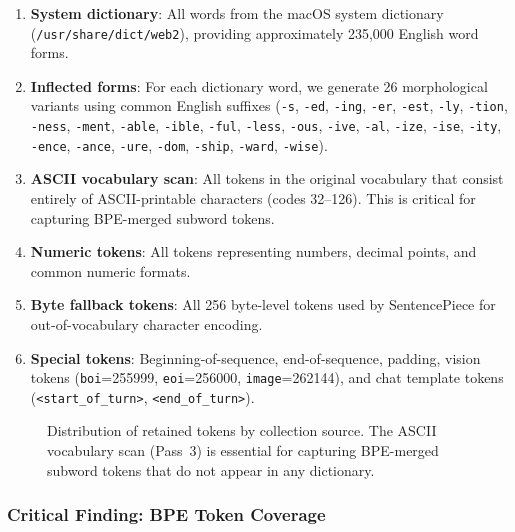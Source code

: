 \documentclass[11pt]{article}
\begin{document}
\begin{enumerate}[leftmargin=*]
    \item \textbf{System dictionary}: All words from the macOS system dictionary (\texttt{/usr/share/dict/web2}), providing approximately 235,000 English word forms.
    \item \textbf{Inflected forms}: For each dictionary word, we generate 26 morphological variants using common English suffixes (\texttt{-s}, \texttt{-ed}, \texttt{-ing}, \texttt{-er}, \texttt{-est}, \texttt{-ly}, \texttt{-tion}, \texttt{-ness}, \texttt{-ment}, \texttt{-able}, \texttt{-ible}, \texttt{-ful}, \texttt{-less}, \texttt{-ous}, \texttt{-ive}, \texttt{-al}, \texttt{-ize}, \texttt{-ise}, \texttt{-ity}, \texttt{-ence}, \texttt{-ance}, \texttt{-ure}, \texttt{-dom}, \texttt{-ship}, \texttt{-ward}, \texttt{-wise}).
    \item \textbf{ASCII vocabulary scan}: All tokens in the original vocabulary that consist entirely of ASCII-printable characters (codes 32--126). This is critical for capturing BPE-merged subword tokens.
    \item \textbf{Numeric tokens}: All tokens representing numbers, decimal points, and common numeric formats.
    \item \textbf{Byte fallback tokens}: All 256 byte-level tokens used by SentencePiece for out-of-vocabulary character encoding.
    \item \textbf{Special tokens}: Beginning-of-sequence, end-of-sequence, padding, vision tokens (\texttt{boi}=255999, \texttt{eoi}=256000, \texttt{image}=262144), and chat template tokens (\texttt{<start\_of\_turn>}, \texttt{<end\_of\_turn>}).
\end{enumerate}

\begin{figure}[t]
    \centering
    \caption{Distribution of retained tokens by collection source. The ASCII vocabulary scan (Pass~3) is essential for capturing BPE-merged subword tokens that do not appear in any dictionary.}
    \label{fig:token_sources}
\end{figure}

\subsubsection{Critical Finding: BPE Token Coverage}
\end{document}
